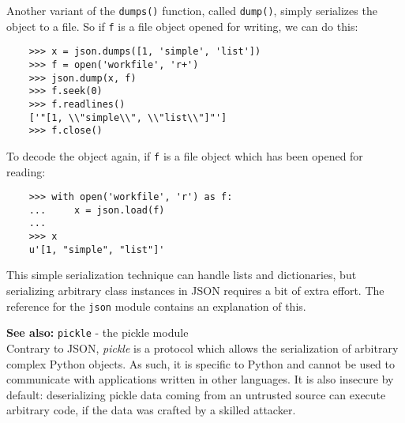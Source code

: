 \documentclass[UTF8]{article}
\begin{document}
Another variant of the \texttt{dumps()} function, called \texttt{dump()}, simply serializes the
object to a file. So if \texttt{f} is a file object opened for writing, we can do this:
\begin{verbatim}
    >>> x = json.dumps([1, 'simple', 'list'])
    >>> f = open('workfile', 'r+')
    >>> json.dump(x, f)
    >>> f.seek(0)
    >>> f.readlines()
    ['"[1, \\"simple\\", \\"list\\"]"']
    >>> f.close()
\end{verbatim}

To decode the object again, if \texttt{f} is a file object which has been opened for reading:
\begin{verbatim}
    >>> with open('workfile', 'r') as f:
    ...     x = json.load(f)
    ...
    >>> x
    u'[1, "simple", "list"]'
\end{verbatim}

This simple serialization technique can handle lists and dictionaries, but serializing arbitrary
class instances in JSON requires a bit of extra effort. The reference for the \texttt{json} module
contains an explanation of this.

\textbf{See also:} \texttt{pickle} - the pickle module \\
Contrary to JSON, \emph{pickle} is a protocol which allows the serialization of arbitrary complex
Python objects. As such, it is specific to Python and cannot be used to communicate with
applications written in other languages. It is also insecure by default: deserializing pickle data
coming from an untrusted source can execute arbitrary code, if the data was crafted by a skilled
attacker.
\end{document}
